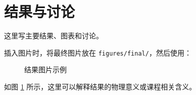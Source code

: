\section{结果与讨论}

这里写主要结果、图表和讨论。

插入图片时，将最终图片放在 \texttt{figures/final/}，然后使用：

\begin{figure}[htbp]
  \centering
  \caption{结果图片示例}
  \label{fig:result-example}
\end{figure}

如图 \ref{fig:result-example} 所示，这里可以解释结果的物理意义或课程相关含义。
